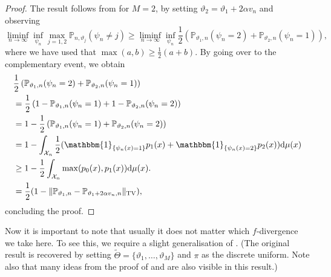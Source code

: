 \documentclass[a4paper]{article}
\begin{document}
\begin{proof}
The result follows from  for $M=2$, by setting $\vartheta_2=\vartheta_1 + 2 \alpha v_n$ and observing
\begin{equation*}
\liminf_{n\rightarrow \infty} \inf_{\psi_n} \max_{j=1,2}\mathbb{P}_{n,\vartheta_j}(\psi_n \neq j) \geq \liminf_{n\rightarrow \infty} \inf_{\psi_n} \frac{1}{2}\left(\mathbb{P}_{\vartheta_1,n}(\psi_n = 2) + \mathbb{P}_{\vartheta_2, n}(\psi_n = 1)\right),
\end{equation*}
where we have used that $\max(a,b) \geq \frac{1}{2}(a+b)$. By going over to the complementary event, we obtain
\begin{equation*}
\begin{aligned}
&\frac{1}{2}\left(\mathbb{P}_{\vartheta_1,n}(\psi_n = 2) + \mathbb{P}_{\vartheta_2, n}(\psi_n = 1)\right) \\
&=\frac{1}{2}\left( 1 - \mathbb{P}_{\vartheta_1,n}(\psi_n=1) + 1- \mathbb{P}_{\vartheta_2,n}(\psi_n=2)\right)\\
&=1 - \frac{1}{2}\left(\mathbb{P}_{\vartheta_1,n}(\psi_n=1)+ \mathbb{P}_{\vartheta_2,n}(\psi_n=2)\right)\\
&=1 - \int_{\mathcal{X}_n} \frac{1}{2}(\mathbbm{1}_{\{\psi_{n}(x)=1\}
}p_1(x) + \mathbbm{1}_{\{\psi_{n}(x)=2\}
}p_2(x) ) \mathrm{d}\mu(x)\\
&\geq 1 - \frac{1}{2}\int_{\mathcal{X}_n} \max(p_0(x), p_1(x))\mathrm{d}\mu(x). \\
&= \frac{1}{2}(1-\Vert \mathbb{P}_{\vartheta_1,n} -  \mathbb{P}_{\vartheta_1 + 2\alpha v_n, n}\Vert_{\mathrm{TV}}),
\end{aligned}
\end{equation*}
concluding the proof. 
\end{proof}
Now it is important to note that usually it does not matter which $f$-divergence we take here. To see this, we require a slight generalisation of . (The original result is recovered by setting $\tilde{\Theta}=\{\vartheta_1, \dots, \vartheta_M\}$ and $\pi$ as the discrete uniform. Note also that many ideas from the proof of  and  are also visible in this result.) 
\end{document}
